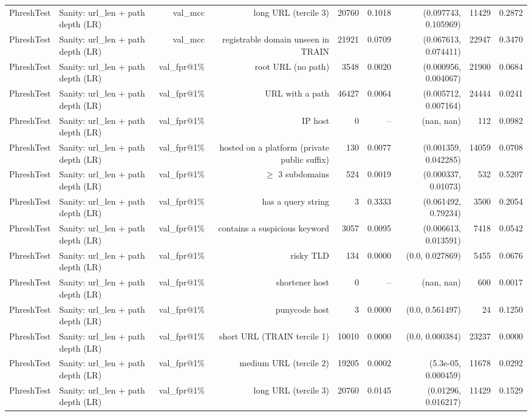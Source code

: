 \begin{table}[t]
\begin{tabular}{llrrrrrrr}
PhreshTest & Sanity: url\_len + path depth (LR) & val\_mcc & long URL (tercile 3) & 20760 & 0.1018 & (0.097743, 0.105969) & 11429 & 0.2872 \\
PhreshTest & Sanity: url\_len + path depth (LR) & val\_mcc & registrable domain unseen in TRAIN & 21921 & 0.0709 & (0.067613, 0.074411) & 22947 & 0.3470 \\
PhreshTest & Sanity: url\_len + path depth (LR) & val\_fpr@1\% & root URL (no path) & 3548 & 0.0020 & (0.000956, 0.004067) & 21900 & 0.0684 \\
PhreshTest & Sanity: url\_len + path depth (LR) & val\_fpr@1\% & URL with a path & 46427 & 0.0064 & (0.005712, 0.007164) & 24444 & 0.0241 \\
PhreshTest & Sanity: url\_len + path depth (LR) & val\_fpr@1\% & IP host & 0 & -- & (nan, nan) & 112 & 0.0982 \\
PhreshTest & Sanity: url\_len + path depth (LR) & val\_fpr@1\% & hosted on a platform (private public suffix) & 130 & 0.0077 & (0.001359, 0.042285) & 14059 & 0.0708 \\
PhreshTest & Sanity: url\_len + path depth (LR) & val\_fpr@1\% & $\geq$ 3 subdomains & 524 & 0.0019 & (0.000337, 0.01073) & 532 & 0.5207 \\
PhreshTest & Sanity: url\_len + path depth (LR) & val\_fpr@1\% & has a query string & 3 & 0.3333 & (0.061492, 0.79234) & 3500 & 0.2054 \\
PhreshTest & Sanity: url\_len + path depth (LR) & val\_fpr@1\% & contains a suspicious keyword & 3057 & 0.0095 & (0.006613, 0.013591) & 7418 & 0.0542 \\
PhreshTest & Sanity: url\_len + path depth (LR) & val\_fpr@1\% & risky TLD & 134 & 0.0000 & (0.0, 0.027869) & 5455 & 0.0676 \\
PhreshTest & Sanity: url\_len + path depth (LR) & val\_fpr@1\% & shortener host & 0 & -- & (nan, nan) & 600 & 0.0017 \\
PhreshTest & Sanity: url\_len + path depth (LR) & val\_fpr@1\% & punycode host & 3 & 0.0000 & (0.0, 0.561497) & 24 & 0.1250 \\
PhreshTest & Sanity: url\_len + path depth (LR) & val\_fpr@1\% & short URL (TRAIN tercile 1) & 10010 & 0.0000 & (0.0, 0.000384) & 23237 & 0.0000 \\
PhreshTest & Sanity: url\_len + path depth (LR) & val\_fpr@1\% & medium URL (tercile 2) & 19205 & 0.0002 & (5.3e-05, 0.000459) & 11678 & 0.0292 \\
PhreshTest & Sanity: url\_len + path depth (LR) & val\_fpr@1\% & long URL (tercile 3) & 20760 & 0.0145 & (0.01296, 0.016217) & 11429 & 0.1529 \\

\end{tabular}
\end{table}
